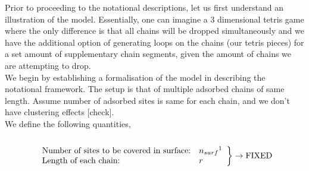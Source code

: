 \documentclass[10pt,letterpaper]{article}
\begin{document}
\newpage
\noindent Prior to proceeding to the notational descriptions, let us first understand an illustration of the model. Essentially, one can imagine a 3 dimensional tetris game where the only difference is that all chains will be dropped simultaneously and we have the additional option of generating loops on the chains (our tetris pieces) for a set amount of supplementary chain segments, given the amount of chains we are attempting to drop.\\

\noindent We begin by establishing a formalisation of the model in describing the notational framework. The setup is that of multiple adsorbed chains of same length. Assume  number of adsorbed sites is same for each chain, and we don't have clustering effects [check].\\

\noindent We define the following quantities,\\\\

$$
\left. %
\begin{array}{ll}
\text{Number of sites to be covered in surface:} & n_{surf}\footnotemark\\
\text{Length of each chain:}& r\\
\end{array}
\right\}
\rightarrow\text{FIXED}
$$
\text{}\\

%
%
%

	 
\end{document}

